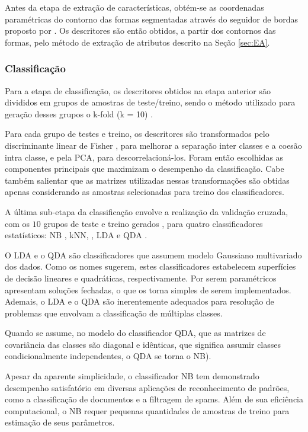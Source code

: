 Antes da etapa de extração de características, obtém-se as coordenadas paramétricas do contorno das formas segmentadas através do seguidor de bordas proposto por .
Os descritores são então obtidos, a partir dos contornos das formas, pelo método de extração de atributos descrito na Seção \ref{sec:EA}. 

\subsubsection*{Classificação}

Para a etapa de classificação, os descritores  obtidos na etapa anterior são divididos em grupos de amostras de teste/treino, sendo o método utilizado para geração desses grupos o k-fold (k = 10) \cite{Webb:2002}. 

Para cada grupo de testes e treino, os descritores são  transformados pelo discriminante linear de Fisher \cite{Webb:2002}, para melhorar a separação inter classes e a coesão intra classe, e pela \ac{PCA}, para  descorrelacioná-los. Foram então escolhidas as componentes principais que maximizam o desempenho da classificação.  Cabe também salientar que as matrizes utilizadas nessas transformações são obtidas apenas considerando as amostras selecionadas para treino dos classificadores.

A última sub-etapa da classificação envolve a realização da validação cruzada, com os $10$ grupos de teste e treino gerados \cite{Webb:2002}, para quatro classificadores estatísticos: \ac{NB} \cite{Fukunaga:1990}, \ac{kNN}, \cite{Fukunaga:1990,Webb:2002}, \ac{LDA} \cite{Webb:2002} e \ac{QDA} \cite{Fukunaga:1990}. 

O \ac{LDA} e o \ac{QDA} são classificadores que assumem modelo Gaussiano multivariado dos dados. Como os nomes sugerem,  estes classificadores estabelecem superfícies de decisão lineares e quadráticas, respectivamente. Por serem paramétricos apresentam soluções fechadas, o que os torna simples de serem implementados. Ademais, o \ac{LDA} e o \ac{QDA} são inerentemente adequados para resolução de problemas que envolvam a classificação de múltiplas classes.

Quando se assume, no modelo do classificador \ac{QDA}, que as matrizes de covariância das classes são diagonal e idênticas, que significa assumir classes condicionalmente independentes, o \ac{QDA} se torna o \ac{NB}). 

Apesar da aparente simplicidade, o classificador \ac{NB} tem demonstrado desempenho satisfatório em diversas aplicações de reconhecimento de padrões, como a classificação de documentos e a filtragem de spams. Além de sua eficiência computacional, o \ac{NB} requer pequenas quantidades de amostras de treino para estimação de seus parâmetros.


